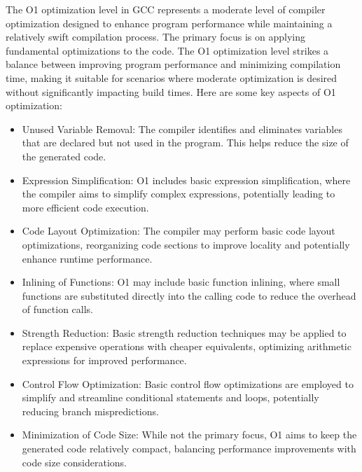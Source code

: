\documentclass[conference]{IEEEtran}
\begin{document}
The O1 optimization level in GCC represents a moderate level of compiler optimization designed to enhance program performance while maintaining a relatively swift compilation process. The primary focus is on applying fundamental optimizations to the code. The O1 optimization level strikes a balance between improving program performance and minimizing compilation time, making it suitable for scenarios where moderate optimization is desired without significantly impacting build times. Here are some key aspects of O1 optimization:
\begin{itemize}
	\item Unused Variable Removal:
The compiler identifies and eliminates variables that are declared but not used in the program. This helps reduce the size of the generated code.
	\item Expression Simplification:
O1 includes basic expression simplification, where the compiler aims to simplify complex expressions, potentially leading to more efficient code execution.
	\item Code Layout Optimization:
The compiler may perform basic code layout optimizations, reorganizing code sections to improve locality and potentially enhance runtime performance.
	\item Inlining of Functions:
O1 may include basic function inlining, where small functions are substituted directly into the calling code to reduce the overhead of function calls.
	\item Strength Reduction:
Basic strength reduction techniques may be applied to replace expensive operations with cheaper equivalents, optimizing arithmetic expressions for improved performance.
	\item Control Flow Optimization:
Basic control flow optimizations are employed to simplify and streamline conditional statements and loops, potentially reducing branch mispredictions.
	\item Minimization of Code Size:
While not the primary focus, O1 aims to keep the generated code relatively compact, balancing performance improvements with code size considerations.
\end{itemize}
\end{document}
